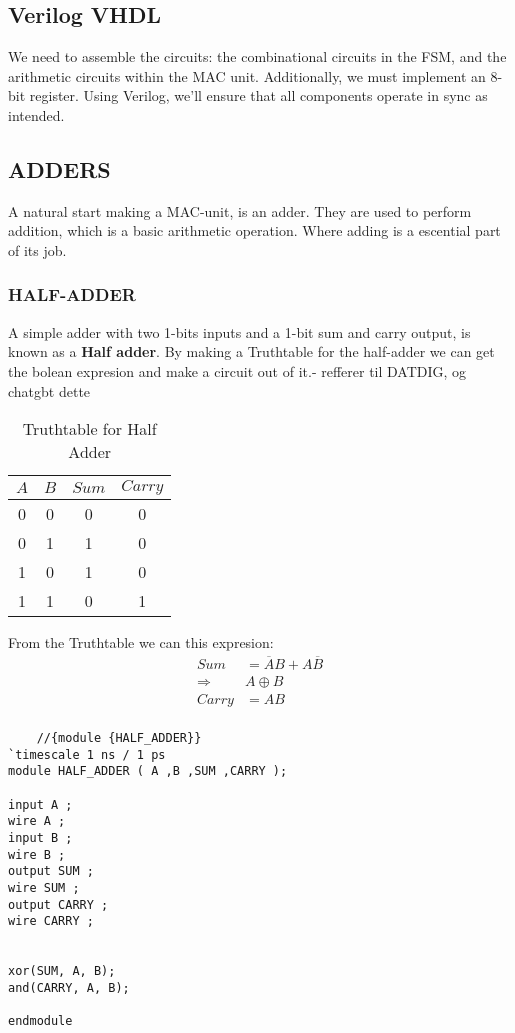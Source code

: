 \subsection{Verilog VHDL}


We need to assemble the circuits: the combinational circuits in the FSM, and the arithmetic circuits within the MAC unit. Additionally, we must implement an 8-bit register. Using Verilog, we'll ensure that all components operate in sync as intended.

\subsection{ADDERS}
A natural start making a MAC-unit, is an adder. They are used to perform addition, which is a basic arithmetic operation. Where adding is a escential part of its job.
\subsubsection{HALF-ADDER}
A simple adder with two 1-bits inputs and a 1-bit sum and carry output, is known as a \textbf{Half adder}. By making a Truthtable for the half-adder we can get the bolean expresion and make a circuit out of it.- refferer til DATDIG, og chatgbt dette
\begin{table}[H]
    \caption{Truthtable for Half Adder}                 
    \centering
    \begin{tabular}{|c|c|c|c|}
    \hline
    \(A\) & \(B\) & \(Sum\) & \(Carry\) \\
    \hline
    0 & 0 & 0 & 0 \\
    0 & 1 & 1 & 0 \\
    1 & 0 & 1 & 0 \\
    1 & 1 & 0 & 1 \\
    \hline
\end{tabular}
\end{table}
From the Truthtable we can this expresion:
\begin{equation}
    \begin{aligned}
        Sum&=\overline{A}B+A\overline{B}\\
        \Rightarrow&A\oplus B\\
        Carry&=AB\\ 
    \end{aligned}
\end{equation}
\begin{lstlisting}
    //{module {HALF_ADDER}}	 
`timescale 1 ns / 1 ps
module HALF_ADDER ( A ,B ,SUM ,CARRY );

input A ;
wire A ;
input B ;
wire B ;
output SUM ;
wire SUM ;
output CARRY ;
wire CARRY ;


xor(SUM, A, B);
and(CARRY, A, B);

endmodule
\end{lstlisting}



